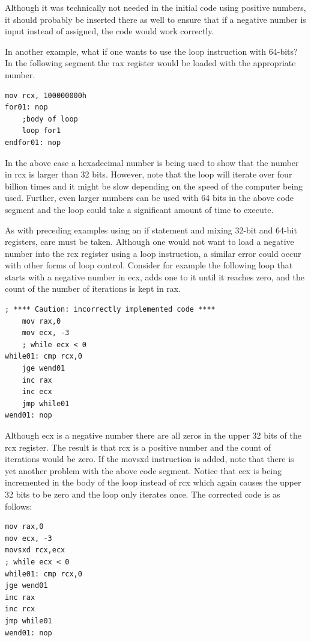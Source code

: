 \documentclass[10pt]{book}
\begin{document}
Although it was technically not needed in the initial code using positive numbers, it should probably be inserted there as well to ensure that if a negative number is input instead of assigned, the code would work correctly.

In another example, what if one wants to use the loop instruction with 64-bits? In the following segment the rax register would be loaded with the appropriate number.

\begin{verbatim}
mov rcx, 100000000h
for01: nop
    ;body of loop
    loop for1
endfor01: nop
\end{verbatim}

In the above case a hexadecimal number is being used to show that the number in rcx is larger than 32 bits. However, note that the loop will iterate over four billion times and it might be slow depending on the speed of the computer being used. Further, even larger numbers can be used with 64 bits in the above code segment and the loop could take a significant amount of time to execute.

As with preceding examples using an if statement and mixing 32-bit and 64-bit registers, care must be taken. Although one would not want to load a negative number into the rcx register using a loop instruction, a similar error could occur with other forms of loop control. Consider for example the following loop that starts with a negative number in ecx, adds one to it until it reaches zero, and the count of the number of iterations is kept in rax.
\begin{verbatim}
; **** Caution: incorrectly implemented code ****
    mov rax,0
    mov ecx, -3
    ; while ecx < 0
while01: cmp rcx,0
    jge wend01
    inc rax
    inc ecx
    jmp while01
wend01: nop
\end{verbatim}

Although ecx is a negative number there are all zeros in the upper 32 bits of the rcx register. The result is that rcx is a positive number and the count of iterations would be zero. If the movsxd instruction is added, note that there is yet another problem with the above code segment. Notice that ecx is being incremented in the body of the loop instead of rcx which again causes the upper 32 bits to be zero and the loop only iterates once. The corrected code is as follows:

\begin{verbatim}
mov rax,0
mov ecx, -3
movsxd rcx,ecx
; while ecx < 0
while01: cmp rcx,0
jge wend01
inc rax
inc rcx
jmp while01
wend01: nop
\end{verbatim}
\end{document}
